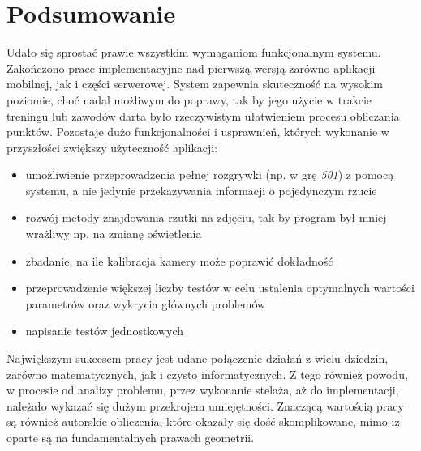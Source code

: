 \chapter{Podsumowanie}
\thispagestyle{chapterBeginStyle}

Udało się sprostać prawie wszystkim wymaganiom funkcjonalnym systemu. Zakończono prace implementacyjne nad pierwszą wersją zarówno aplikacji mobilnej, jak i części serwerowej. System zapewnia skuteczność na wysokim poziomie, choć nadal możliwym do poprawy, tak by jego użycie w trakcie treningu lub zawodów darta było rzeczywistym ułatwieniem procesu obliczania punktów. Pozostaje dużo funkcjonalności i usprawnień, których wykonanie w przyszłości zwiększy użyteczność aplikacji:
\begin{itemize}
  \item umożliwienie przeprowadzenia pełnej rozgrywki (np. w grę \textit{501}) z pomocą systemu, a nie jedynie przekazywania informacji o pojedynczym rzucie
  \item rozwój metody znajdowania rzutki na zdjęciu, tak by program był mniej wrażliwy np. na zmianę oświetlenia
  \item zbadanie, na ile kalibracja kamery może poprawić dokładność
  \item przeprowadzenie większej liczby testów w celu ustalenia optymalnych wartości parametrów oraz wykrycia głównych problemów
  \item napisanie testów jednostkowych
  
\end{itemize}

Największym sukcesem pracy jest udane połączenie działań z wielu dziedzin, zarówno matematycznych, jak i czysto informatycznych. Z tego również powodu, w procesie od analizy problemu, przez wykonanie stelaża, aż do implementacji, należało wykazać się dużym przekrojem umiejętności. Znaczącą wartością pracy są również autorskie obliczenia, które okazały się dość skomplikowane, mimo iż oparte są na fundamentalnych prawach geometrii. 